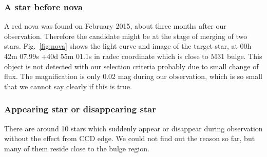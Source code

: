 \documentclass[iop, apj]{emulateapj}
\newcommand{\?}{\stackrel{?}{=}}
\begin{document}
\subsubsection{A star before nova}
A red nova was found on February 2015, about three months after our observation. Therefore the candidate might be at the stage of merging of two stars. Fig.~\ref{fig:nova} shows the light curve and image of the target star, at 00h 42m 07.99s +40d 55m 01.1s in radec coordinate which is close to M31 bulge. This object is not detected with our selection criteria probably due to small change of flux. The magnification is only 0.02 mag during our observation, which is so small that we cannot say clearly if this is true.  
%

\subsubsection{Appearing star or disappearing star}
There are around 10 stars which suddenly appear or disappear during observation without the effect from CCD edge. We could not find out the reason so far, but many of them reside close to the bulge region. 
%

\end{document}
